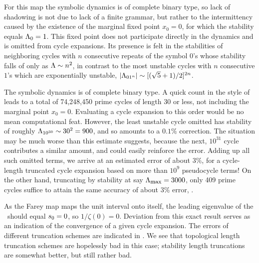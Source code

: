For this map the symbolic dynamics
is of complete binary type, so lack of shadowing is not due to
lack of a finite grammar, but rather to the
intermittency caused by the existence of the marginal fixed point $x_0=0$,
for which the stability equals
$\Lambda_0=1$.  This fixed point does not
participate directly in the dynamics and is omitted from cycle
expansions.  Its presence is felt in
the stabilities of neighboring cycles with $n$ consecutive repeats
of the symbol $0$'s whose stability falls of only as
$\Lambda\sim n^2$, in contrast to
the most unstable cycles with $n$ consecutive $1$'s which  are
exponentially unstable, $|\Lambda_{01^n}|\sim[(\sqrt{5}+1)/2]^{2n}$.

The symbolic dynamics
is of complete binary type. A quick count in the style
of \wwwcb %
leads to a total of
74,248,450 prime cycles of length 30 or less, not including the marginal
point $x_0=0$. Evaluating a cycle expansion to this order
would be no mean computational feat.  However, the least unstable cycle
omitted has stability of roughly
$\Lambda_{10^{30}} \sim 30^2=900$, and so amounts to
a $0.1\%$ correction.  The situation may be much worse than this estimate
suggests, because the next, $10^{31}$
cycle contributes a similar amount, and could
easily reinforce the error.  Adding up all such omitted terms, we arrive
at an estimated error of about $3\%$,  for a cycle-length truncated
cycle expansion
based on more than $10^9$ pseudocycle terms! On the other hand,
truncating by stability at say $\stabCutoff=3000$,
only 409 prime cycles suffice to attain the same
accuracy of about $3\%$ error, .

As the Farey map maps the unit interval onto itself, the leading eigenvalue of
the \FPoper\ should equal $s_0=0$, so
$1/\zeta(0)=0$. Deviation from this exact result serves as an indication
of the convergence of a given cycle expansion.
The errors of different truncation
schemes are indicated in .
We see that topological length truncation schemes are hopelessly
bad in this case; stability length truncations are somewhat better,
but still rather bad.


